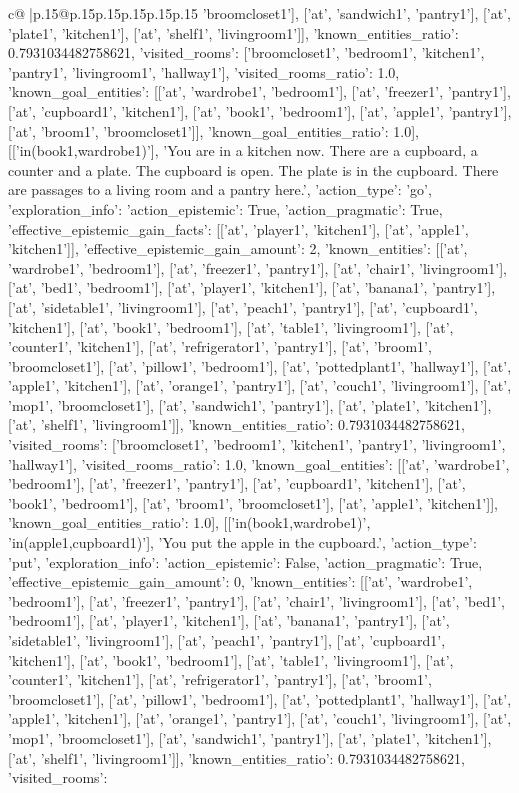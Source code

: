 \documentclass{article}
\begin{document}
{\begin{supertabular}{c@{$\;$}|p{.15\linewidth}@{}p{.15\linewidth}p{.15\linewidth}p{.15\linewidth}p{.15\linewidth}p{.15\linewidth}}
{{{'broomcloset1'], ['at', 'sandwich1', 'pantry1'], ['at', 'plate1', 'kitchen1'], ['at', 'shelf1', 'livingroom1']], 'known_entities_ratio': 0.7931034482758621, 'visited_rooms': ['broomcloset1', 'bedroom1', 'kitchen1', 'pantry1', 'livingroom1', 'hallway1'], 'visited_rooms_ratio': 1.0, 'known_goal_entities': [['at', 'wardrobe1', 'bedroom1'], ['at', 'freezer1', 'pantry1'], ['at', 'cupboard1', 'kitchen1'], ['at', 'book1', 'bedroom1'], ['at', 'apple1', 'pantry1'], ['at', 'broom1', 'broomcloset1']], 'known_goal_entities_ratio': 1.0}}], [['in(book1,wardrobe1)'], 'You are in a kitchen now. There are a cupboard, a counter and a plate. The cupboard is open. The plate is in the cupboard. There are passages to a living room and a pantry here.', {'action_type': 'go', 'exploration_info': {'action_epistemic': True, 'action_pragmatic': True, 'effective_epistemic_gain_facts': [['at', 'player1', 'kitchen1'], ['at', 'apple1', 'kitchen1']], 'effective_epistemic_gain_amount': 2, 'known_entities': [['at', 'wardrobe1', 'bedroom1'], ['at', 'freezer1', 'pantry1'], ['at', 'chair1', 'livingroom1'], ['at', 'bed1', 'bedroom1'], ['at', 'player1', 'kitchen1'], ['at', 'banana1', 'pantry1'], ['at', 'sidetable1', 'livingroom1'], ['at', 'peach1', 'pantry1'], ['at', 'cupboard1', 'kitchen1'], ['at', 'book1', 'bedroom1'], ['at', 'table1', 'livingroom1'], ['at', 'counter1', 'kitchen1'], ['at', 'refrigerator1', 'pantry1'], ['at', 'broom1', 'broomcloset1'], ['at', 'pillow1', 'bedroom1'], ['at', 'pottedplant1', 'hallway1'], ['at', 'apple1', 'kitchen1'], ['at', 'orange1', 'pantry1'], ['at', 'couch1', 'livingroom1'], ['at', 'mop1', 'broomcloset1'], ['at', 'sandwich1', 'pantry1'], ['at', 'plate1', 'kitchen1'], ['at', 'shelf1', 'livingroom1']], 'known_entities_ratio': 0.7931034482758621, 'visited_rooms': ['broomcloset1', 'bedroom1', 'kitchen1', 'pantry1', 'livingroom1', 'hallway1'], 'visited_rooms_ratio': 1.0, 'known_goal_entities': [['at', 'wardrobe1', 'bedroom1'], ['at', 'freezer1', 'pantry1'], ['at', 'cupboard1', 'kitchen1'], ['at', 'book1', 'bedroom1'], ['at', 'broom1', 'broomcloset1'], ['at', 'apple1', 'kitchen1']], 'known_goal_entities_ratio': 1.0}}], [['in(book1,wardrobe1)', 'in(apple1,cupboard1)'], 'You put the apple in the cupboard.', {'action_type': 'put', 'exploration_info': {'action_epistemic': False, 'action_pragmatic': True, 'effective_epistemic_gain_amount': 0, 'known_entities': [['at', 'wardrobe1', 'bedroom1'], ['at', 'freezer1', 'pantry1'], ['at', 'chair1', 'livingroom1'], ['at', 'bed1', 'bedroom1'], ['at', 'player1', 'kitchen1'], ['at', 'banana1', 'pantry1'], ['at', 'sidetable1', 'livingroom1'], ['at', 'peach1', 'pantry1'], ['at', 'cupboard1', 'kitchen1'], ['at', 'book1', 'bedroom1'], ['at', 'table1', 'livingroom1'], ['at', 'counter1', 'kitchen1'], ['at', 'refrigerator1', 'pantry1'], ['at', 'broom1', 'broomcloset1'], ['at', 'pillow1', 'bedroom1'], ['at', 'pottedplant1', 'hallway1'], ['at', 'apple1', 'kitchen1'], ['at', 'orange1', 'pantry1'], ['at', 'couch1', 'livingroom1'], ['at', 'mop1', 'broomcloset1'], ['at', 'sandwich1', 'pantry1'], ['at', 'plate1', 'kitchen1'], ['at', 'shelf1', 'livingroom1']], 'known_entities_ratio': 0.7931034482758621, 'visited_rooms': }}}
\end{supertabular}}
\end{document}
